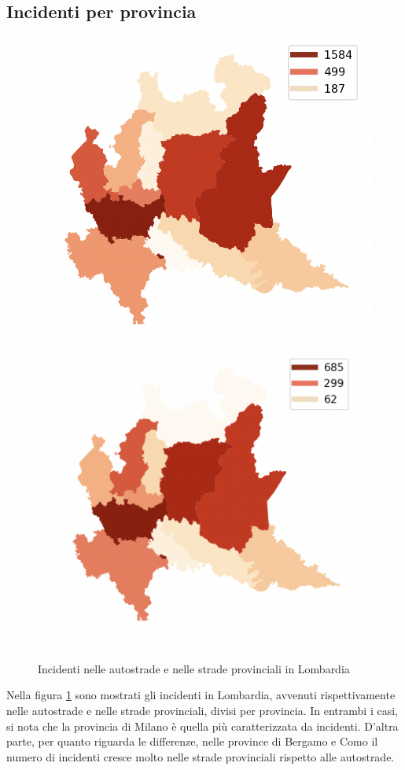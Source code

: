 \documentclass[a4paper]{report}
\begin{document}
\subsection{Incidenti per provincia}

\begin{figure}
    \includegraphics[width=0.5\linewidth]{../src/provincia/lombardia_autostrade.png}
    \includegraphics[width=0.5\linewidth]{../src/provincia/lombardia_strade_prov.png}
    \caption{Incidenti nelle autostrade e nelle strade provinciali in Lombardia}
    \label{fig:lombardia-strade}
\end{figure}

Nella figura \ref{fig:lombardia-strade} sono mostrati gli incidenti in Lombardia, 
avvenuti rispettivamente nelle autostrade e nelle strade provinciali, divisi per provincia.
In entrambi i casi, si nota che la provincia di Milano è quella più caratterizzata da incidenti. 
D'altra parte, per quanto riguarda le differenze, nelle province di Bergamo e Como il numero di 
incidenti cresce molto nelle strade provinciali rispetto alle autostrade.
\end{document}
